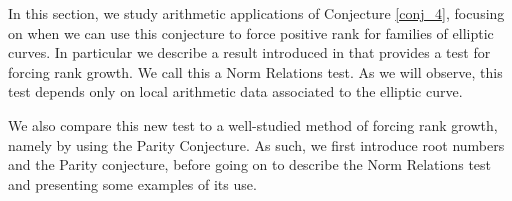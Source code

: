 In this section, we study arithmetic applications of Conjecture \ref{conj_4}, focusing on when we can use this conjecture to force positive rank for families of elliptic curves. In particular we describe a result introduced in \cite{DEW1} that provides a test for forcing rank growth. We call this a Norm Relations test. As we will observe, this test depends only on local arithmetic data associated to the elliptic curve. 

We also compare this new test to a well-studied method of forcing rank growth, namely by using the Parity Conjecture. As such, we first introduce root numbers and the Parity conjecture, before going on to describe the Norm Relations test and presenting some examples of its use. 








